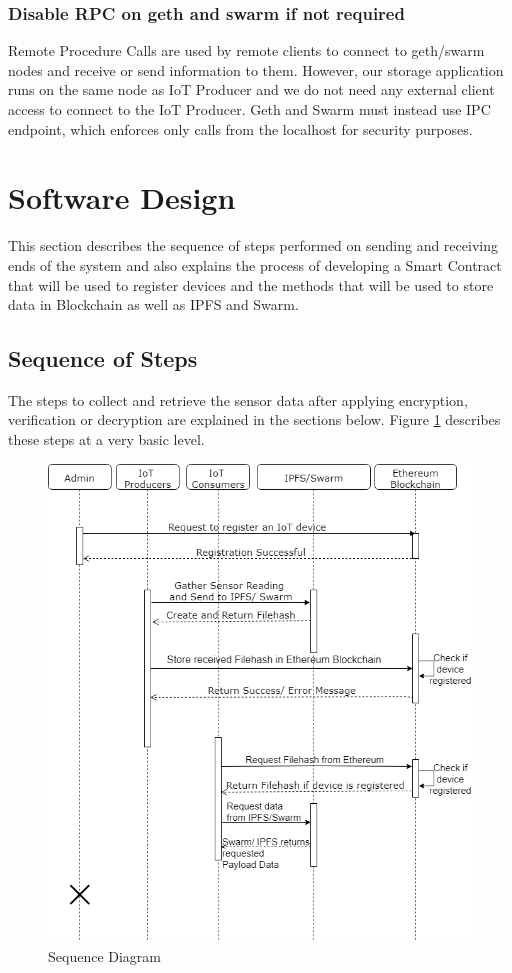 \documentclass[11pt,openright]{report}
\begin{document}
\subsubsection{Disable RPC on geth and swarm if not required}
Remote Procedure Calls are used by remote clients to connect to geth/swarm nodes and receive or send information to them. However, our storage application runs on the same node as IoT Producer and we do not need any external client access to connect to the IoT Producer. Geth and Swarm must instead use IPC endpoint, which enforces only calls from the localhost for security purposes.

\section{Software Design} \label{ss:software_design}
This section describes the sequence of steps performed on sending and receiving ends of the system and also explains the process of developing a Smart Contract that will be used to register devices and the methods that will be used to store data in Blockchain as well as IPFS and Swarm.

\subsection{Sequence of Steps}
The steps to collect and retrieve the sensor data after applying encryption, verification or decryption are explained in the sections below. Figure \ref{fig:dataflow_diagram} describes these steps at a very basic level.
\newpage
\hfill\\
\begin{figure}[!htbp]
    \centering
    \includegraphics[scale=0.5]{images/SequenceDiagram.png}
    \caption{Sequence Diagram}
    \label{fig:dataflow_diagram}
\end{figure}
\newline
\newline
\end{document}
